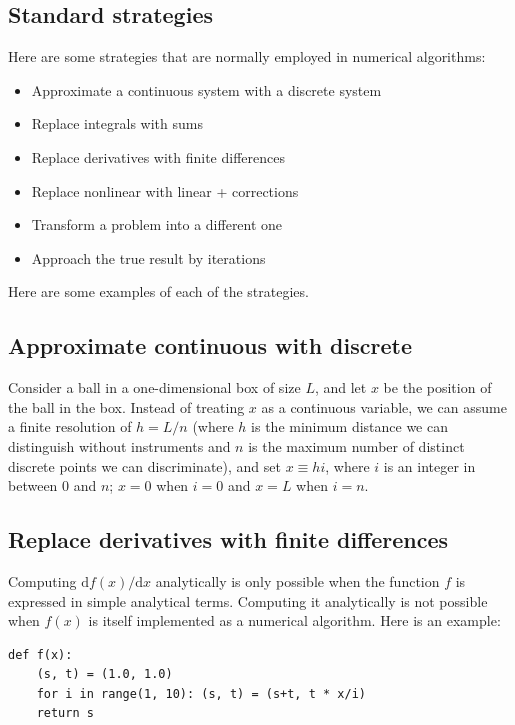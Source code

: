 \documentclass[justified, sixbynine]{tufte-book}
\theoremstyle{plain}%
\newtheorem * {corollary}{Corollary}
\theoremstyle{definition}
\theoremstyle{remark}
\newtheorem * {remark}{Remark}
\newtheorem * {note}{Note}
\begin{document}
\begin{fullwidth}
\goodbreak\section{Standard strategies}

Here are some strategies that are normally employed in numerical algorithms:

\begin{itemize}
\item Approximate a continuous system with a discrete system
\item Replace integrals with sums
\item Replace derivatives with finite differences
\item Replace nonlinear with linear + corrections
\item Transform a problem into a different one
\item Approach the true result by iterations
\end{itemize}

Here are some examples of each of the strategies.

\goodbreak\subsection{Approximate continuous with discrete}

Consider a ball in a one-dimensional box of size $L$, and let $x$ be the position of the ball in the box. Instead of treating $x$ as a continuous variable, we can assume a finite resolution of $h = L/n$ (where $h$ is the minimum distance we can distinguish without instruments and $n$ is the maximum number of distinct discrete points we can discriminate), and set $x \equiv h i$, where $i$ is an integer in between $0$ and $n$; $x=0$ when $i=0$ and $x=L$ when $i=n$.


\goodbreak\subsection{Replace derivatives with finite differences}


Computing $\textrm{d}f(x)/\textrm{d}x$ analytically is only possible when the function $f$ is expressed in simple analytical terms. Computing it analytically is not possible when $f(x)$ is itself implemented as a numerical algorithm. Here is an example:

\begin{lstlisting}
def f(x):
    (s, t) = (1.0, 1.0)
    for i in range(1, 10): (s, t) = (s+t, t * x/i)
    return s
\end{lstlisting}


\end{fullwidth}
\end{document}
